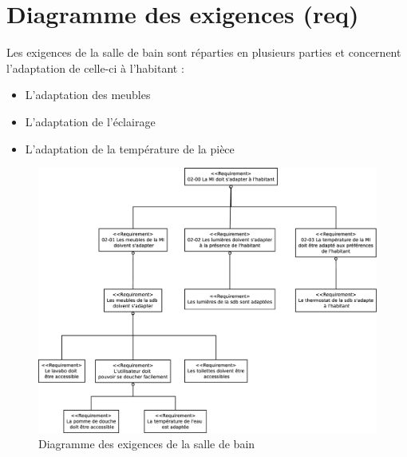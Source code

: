 \chapter{Diagramme des exigences (req)}\label{req}
Les exigences de la salle de bain sont réparties en plusieurs parties et concernent l'adaptation de celle-ci à l'habitant : 
\begin{itemize}
	\item L'adaptation des meubles
	\item L'adaptation de l'éclairage
	\item L'adaptation de la température de la pièce
\end{itemize}
\vfill
\begin{figure}[H]
	\centering
	\includegraphics[width=1\linewidth]{diagrams/bathroom/diagramme_exiquences_req.eps}
	\caption{Diagramme des exigences de la salle de bain}
	\label{fig:requirements}
\end{figure}

